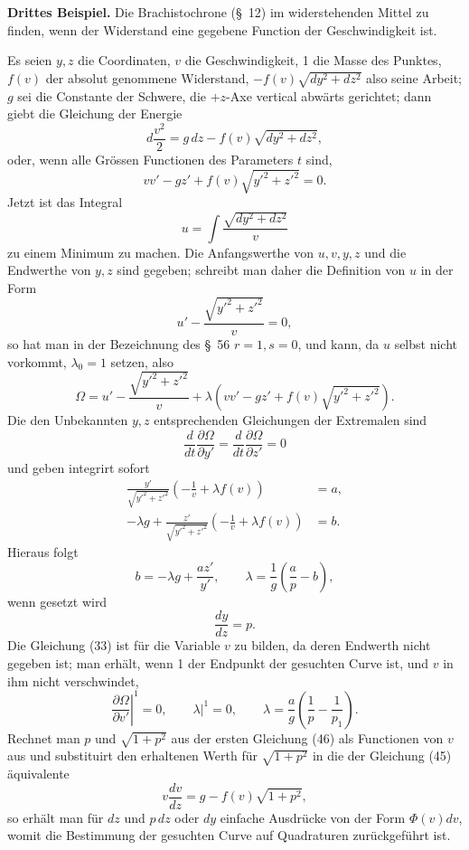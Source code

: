 \documentclass[11pt,a4paper,leqno]{article}
\begin{document}
\noindent\textbf{Drittes Beispiel.} Die Brachistochrone (\S~12) im widerstehenden Mittel zu finden, wenn der Widerstand eine gegebene Function der Geschwindigkeit ist.

Es seien $y,z$ die Coordinaten, $v$ die Geschwindigkeit, 1 die Masse des Punktes, $f(v)$ der absolut genommene Widerstand, $-f(v)\sqrt{dy^2+dz^2}$ also seine Arbeit; $g$ sei die Constante der Schwere, die $+z$-Axe vertical abwärts gerichtet; dann giebt die Gleichung der Energie
\[
d\frac{v^2}{2}=g\,dz-f(v)\sqrt{dy^2+dz^2},
\]
oder, wenn alle Grössen Functionen des Parameters $t$ sind,
\begin{equation}\tag{45}
vv'-gz'+f(v)\sqrt{y'^2+z'^2}=0.
\end{equation}
Jetzt ist das Integral
\[
u=\int\frac{\sqrt{dy^2+dz^2}}{v}
\]
zu einem Minimum zu machen. Die Anfangswerthe von $u,v,y,z$ und die Endwerthe von $y,z$ sind gegeben; schreibt man daher die Definition von $u$ in der Form
\[
u'-\frac{\sqrt{y'^2+z'^2}}{v}=0,
\]
so hat man in der Bezeichnung des \S~56 $r=1,s=0$, und kann, da $u$ selbst nicht vorkommt, $\lambda_0=1$ setzen, also
\[
\Omega=u'-\frac{\sqrt{y'^2+z'^2}}{v}
+\lambda\left(vv'-gz'+f(v)\sqrt{y'^2+z'^2}\right).
\]
Die den Unbekannten $y,z$ entsprechenden Gleichungen der Extremalen sind
\[
\frac{d}{dt}\frac{\partial\Omega}{\partial y'}
=\frac{d}{dt}\frac{\partial\Omega}{\partial z'}=0
\]
und geben integrirt sofort
\begin{equation}\tag{46}
\begin{aligned}
\frac{y'}{\sqrt{y'^2+z'^2}}\left(-\frac1v+\lambda f(v)\right)&=a,\\
-\lambda g+\frac{z'}{\sqrt{y'^2+z'^2}}\left(-\frac1v+\lambda f(v)\right)&=b.
\end{aligned}
\end{equation}
Hieraus folgt
\[
b=-\lambda g+\frac{az'}{y'},\qquad
\lambda=\frac1g\left(\frac ap-b\right),
\]
wenn gesetzt wird
\[
\frac{dy}{dz}=p.
\]
Die Gleichung (33) ist für die Variable $v$ zu bilden, da deren Endwerth nicht gegeben ist; man erhält, wenn 1 der Endpunkt der gesuchten Curve ist, und $v$ in ihm nicht verschwindet,
\[
\left.\frac{\partial\Omega}{\partial v'}\right|^1=0,\qquad
\left.\lambda\right|^1=0,\qquad
\lambda=\frac ag\left(\frac1p-\frac1{p_1}\right).
\]
Rechnet man $p$ und $\sqrt{1+p^2}$ aus der ersten Gleichung (46) als Functionen von $v$ aus und substituirt den erhaltenen Werth für $\sqrt{1+p^2}$ in die der Gleichung (45) äquivalente
\[
v\frac{dv}{dz}=g-f(v)\sqrt{1+p^2},
\]
so erhält man für $dz$ und $p\,dz$ oder $dy$ einfache Ausdrücke von der Form $\Phi(v)dv$, womit die Bestimmung der gesuchten Curve auf Quadraturen zurückgeführt ist.
\end{document}

